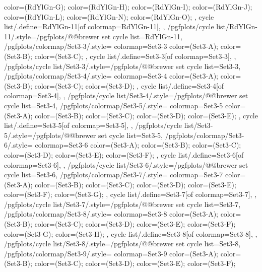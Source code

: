 {{{      color=(RdYlGn-G);
      color=(RdYlGn-H);
      color=(RdYlGn-I);
      color=(RdYlGn-J);
      color=(RdYlGn-L);
      color=(RdYlGn-N);
      color=(RdYlGn-O);
    },
    cycle list/.define={RdYlGn-11}{[of colormap=RdYlGn-11]},
  },
  /pgfplots/cycle list/RdYlGn-11/.style={/pgfplots/@@brewer set cycle list={RdYlGn-11}},
  /pgfplots/colormap/Set3-3/.style={
    colormap={Set3-3}{
      color=(Set3-A);
      color=(Set3-B);
      color=(Set3-C);
    },
    cycle list/.define={Set3-3}{[of colormap=Set3-3]},
  },
  /pgfplots/cycle list/Set3-3/.style={/pgfplots/@@brewer set cycle list={Set3-3}},
  /pgfplots/colormap/Set3-4/.style={
    colormap={Set3-4}{
      color=(Set3-A);
      color=(Set3-B);
      color=(Set3-C);
      color=(Set3-D);
    },
    cycle list/.define={Set3-4}{[of colormap=Set3-4]},
  },
  /pgfplots/cycle list/Set3-4/.style={/pgfplots/@@brewer set cycle list={Set3-4}},
  /pgfplots/colormap/Set3-5/.style={
    colormap={Set3-5}{
      color=(Set3-A);
      color=(Set3-B);
      color=(Set3-C);
      color=(Set3-D);
      color=(Set3-E);
    },
    cycle list/.define={Set3-5}{[of colormap=Set3-5]},
  },
  /pgfplots/cycle list/Set3-5/.style={/pgfplots/@@brewer set cycle list={Set3-5}},
  /pgfplots/colormap/Set3-6/.style={
    colormap={Set3-6}{
      color=(Set3-A);
      color=(Set3-B);
      color=(Set3-C);
      color=(Set3-D);
      color=(Set3-E);
      color=(Set3-F);
    },
    cycle list/.define={Set3-6}{[of colormap=Set3-6]},
  },
  /pgfplots/cycle list/Set3-6/.style={/pgfplots/@@brewer set cycle list={Set3-6}},
  /pgfplots/colormap/Set3-7/.style={
    colormap={Set3-7}{
      color=(Set3-A);
      color=(Set3-B);
      color=(Set3-C);
      color=(Set3-D);
      color=(Set3-E);
      color=(Set3-F);
      color=(Set3-G);
    },
    cycle list/.define={Set3-7}{[of colormap=Set3-7]},
  },
  /pgfplots/cycle list/Set3-7/.style={/pgfplots/@@brewer set cycle list={Set3-7}},
  /pgfplots/colormap/Set3-8/.style={
    colormap={Set3-8}{
      color=(Set3-A);
      color=(Set3-B);
      color=(Set3-C);
      color=(Set3-D);
      color=(Set3-E);
      color=(Set3-F);
      color=(Set3-G);
      color=(Set3-H);
    },
    cycle list/.define={Set3-8}{[of colormap=Set3-8]},
  },
  /pgfplots/cycle list/Set3-8/.style={/pgfplots/@@brewer set cycle list={Set3-8}},
  /pgfplots/colormap/Set3-9/.style={
    colormap={Set3-9}{
      color=(Set3-A);
      color=(Set3-B);
      color=(Set3-C);
      color=(Set3-D);
      color=(Set3-E);
      color=(Set3-F);
}}}
